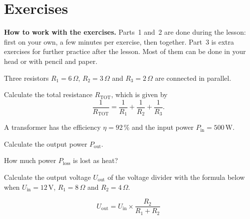 
\section{Exercises}
\label{c2:sec:uppgifter}

\begin{aside}
\textbf{How to work with the exercises.} Parts~1 and~2 are done during the lesson: first on your
own, a few minutes per exercise, then together. Part~3 is extra exercises for further practice
after the lesson. Most of them can be done in your head or with pencil and paper.

\end{aside}


Three resistors $R_1 = 6\,\Omega$, $R_2 = 3\,\Omega$ and $R_3 = 2\,\Omega$ are connected in
parallel.


Calculate the total resistance $R_{\text{TOT}}$, which is given by
\[
  \frac{1}{R_{\text{TOT}}} = \frac{1}{R_1} + \frac{1}{R_2} + \frac{1}{R_3}.
\]

A transformer has the efficiency $\eta = 92\,\%$ and the input power $P_{\text{in}} =
500\,\text{W}$.


\begin{parts}
  \item Calculate the output power $P_{\text{out}}$.
  \item How much power $P_{\text{loss}}$ is lost as heat?
\end{parts}

Calculate the output voltage $U_{\text{out}}$ of the voltage divider with the formula below when
$U_{\text{in}} = 12\,\text{V}$, $R_1 = 8\,\Omega$ and $R_2 = 4\,\Omega$.


\[
  U_{\text{out}} = U_{\text{in}} \times \frac{R_2}{R_1 + R_2}
\]

